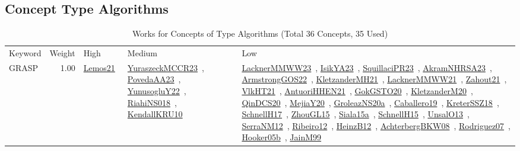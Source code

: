 \subsection{Concept Type Algorithms}
\label{sec:Algorithms}
\label{Algorithms}
{\scriptsize
\begin{longtable}{p{3cm}r>{\raggedright\arraybackslash}p{6cm}>{\raggedright\arraybackslash}p{6cm}>{\raggedright\arraybackslash}p{8cm}}
\rowcolor{white}\caption{Works for Concepts of Type Algorithms (Total 36 Concepts, 35 Used)}\\ \toprule
\rowcolor{white}Keyword & Weight & High & Medium & Low\\ \midrule\endhead
\bottomrule
\endfoot
\index{GRASP}\index{Algorithms!GRASP}GRASP &  1.00 & \href{../works/Lemos21.pdf}{Lemos21}~\cite{Lemos21} & \href{../works/YuraszeckMCCR23.pdf}{YuraszeckMCCR23}~\cite{YuraszeckMCCR23}, \href{../works/PovedaAA23.pdf}{PovedaAA23}~\cite{PovedaAA23}, \href{../works/YunusogluY22.pdf}{YunusogluY22}~\cite{YunusogluY22}, \href{../works/RiahiNS018.pdf}{RiahiNS018}~\cite{RiahiNS018}, \href{../works/KendallKRU10.pdf}{KendallKRU10}~\cite{KendallKRU10} & \href{../works/LacknerMMWW23.pdf}{LacknerMMWW23}~\cite{LacknerMMWW23}, \href{../works/IsikYA23.pdf}{IsikYA23}~\cite{IsikYA23}, \href{../works/SquillaciPR23.pdf}{SquillaciPR23}~\cite{SquillaciPR23}, \href{../works/AkramNHRSA23.pdf}{AkramNHRSA23}~\cite{AkramNHRSA23}, \href{../works/ArmstrongGOS22.pdf}{ArmstrongGOS22}~\cite{ArmstrongGOS22}, \href{../works/KletzanderMH21.pdf}{KletzanderMH21}~\cite{KletzanderMH21}, \href{../works/LacknerMMWW21.pdf}{LacknerMMWW21}~\cite{LacknerMMWW21}, \href{../works/Zahout21.pdf}{Zahout21}~\cite{Zahout21}, \href{../works/VlkHT21.pdf}{VlkHT21}~\cite{VlkHT21}, \href{../works/AntuoriHHEN21.pdf}{AntuoriHHEN21}~\cite{AntuoriHHEN21}, \href{../works/GokGSTO20.pdf}{GokGSTO20}~\cite{GokGSTO20}, \href{../works/KletzanderM20.pdf}{KletzanderM20}~\cite{KletzanderM20}, \href{../works/QinDCS20.pdf}{QinDCS20}~\cite{QinDCS20}, \href{../works/MejiaY20.pdf}{MejiaY20}~\cite{MejiaY20}, \href{../works/GroleazNS20a.pdf}{GroleazNS20a}~\cite{GroleazNS20a}, \href{../works/Caballero19.pdf}{Caballero19}~\cite{Caballero19}, \href{../works/KreterSSZ18.pdf}{KreterSSZ18}~\cite{KreterSSZ18}, \href{../works/SchnellH17.pdf}{SchnellH17}~\cite{SchnellH17}, \href{../works/ZhouGL15.pdf}{ZhouGL15}~\cite{ZhouGL15}, \href{../works/Siala15a.pdf}{Siala15a}~\cite{Siala15a}, \href{../works/SchnellH15.pdf}{SchnellH15}~\cite{SchnellH15}, \href{../works/UnsalO13.pdf}{UnsalO13}~\cite{UnsalO13}, \href{../works/SerraNM12.pdf}{SerraNM12}~\cite{SerraNM12}, \href{../works/Ribeiro12.pdf}{Ribeiro12}~\cite{Ribeiro12}, \href{../works/HeinzB12.pdf}{HeinzB12}~\cite{HeinzB12}, \href{../works/AchterbergBKW08.pdf}{AchterbergBKW08}~\cite{AchterbergBKW08}, \href{../works/Rodriguez07.pdf}{Rodriguez07}~\cite{Rodriguez07}, \href{../works/Hooker05b.pdf}{Hooker05b}~\cite{Hooker05b}, \href{../works/JainM99.pdf}{JainM99}~\cite{JainM99}\\

\end{longtable}}
